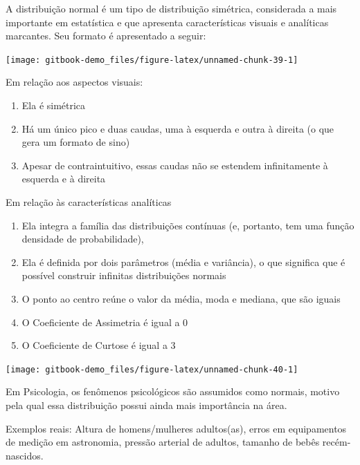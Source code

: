 \documentclass[
]{book}
\providecommand{\tightlist}{%
  \setlength{\itemsep}{0pt}\setlength{\parskip}{0pt}}
\begin{document}
A distribuição normal é um tipo de distribuição simétrica, considerada a mais importante em estatística e que apresenta características visuais e analíticas marcantes. Seu formato é apresentado a seguir:

\begin{center}\texttt{[image: gitbook-demo\_files/figure-latex/unnamed-chunk-39-1]} \end{center}

Em relação aos aspectos visuais:

\begin{enumerate}
\def\labelenumi{\arabic{enumi})}
\tightlist
\item
  Ela é simétrica
\item
  Há um único pico e duas caudas, uma à esquerda e outra à direita (o que gera um formato de sino)
\item
  Apesar de contraintuitivo, essas caudas não se estendem infinitamente à esquerda e à direita
\end{enumerate}

Em relação às características analíticas

\begin{enumerate}
\def\labelenumi{\arabic{enumi})}
\tightlist
\item
  Ela integra a família das distribuições contínuas (e, portanto, tem uma função densidade de probabilidade),
\item
  Ela é definida por dois parâmetros (média e variância), o que significa que é possível construir infinitas distribuições normais\\
\item
  O ponto ao centro reúne o valor da média, moda e mediana, que são iguais
\item
  O Coeficiente de Assimetria é igual a 0
\item
  O Coeficiente de Curtose é igual a 3
\end{enumerate}

\begin{center}\texttt{[image: gitbook-demo\_files/figure-latex/unnamed-chunk-40-1]} \end{center}

Em Psicologia, os fenômenos psicológicos são assumidos como normais, motivo pela qual essa distribuição possui ainda mais importância na área.

Exemplos reais: Altura de homens/mulheres adultos(as), erros em equipamentos de medição em astronomia, pressão arterial de adultos, tamanho de bebês recém-nascidos.
\end{document}
